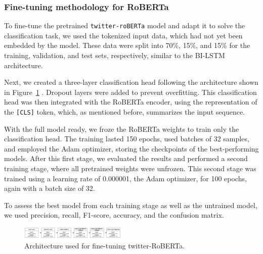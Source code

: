 \subsubsection*{Fine-tuning methodology for RoBERTa}

To fine-tune the pretrained \texttt{twitter-roBERTa} model and adapt it to solve the classification task, we used the tokenized input data, which had not yet been embedded by the model. These data were split into 70\%, 15\%, and 15\% for the training, validation, and test sets, respectively, similar to the BI-LSTM architecture. 

Next, we created a three-layer classification head following the architecture shown in Figure~\ref{fig:roberta_finetune_architecture} \cite{liu2019roberta}. Dropout layers were added to prevent overfitting. This classification head was then integrated with the RoBERTa encoder, using the representation of the \texttt{[CLS]} token, which, as mentioned before, summarizes the input sequence.

With the full model ready, we froze the RoBERTa weights to train only the classification head. The training lasted 150 epochs, used batches of 32 samples, and employed the Adam optimizer, storing the checkpoints of the best-performing models. After this first stage, we evaluated the results and performed a second training stage, where all pretrained weights were unfrozen. This second stage was trained using a learning rate of 0.000001, the Adam optimizer, for 100 epochs, again with a batch size of 32.

To assess the best model from each training stage as well as the untrained model, we used precision, recall, F1-score, accuracy, and the confusion matrix.

\begin{figure}[htbp]
  \centering
  \includegraphics[width=0.45\textwidth]{images/roberta_finetune_architecture.png}
  \caption{Architecture used for fine-tuning twitter-RoBERTa.}
  \label{fig:roberta_finetune_architecture}
\end{figure}

